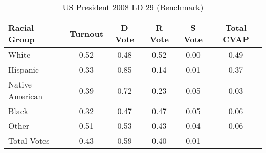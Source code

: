 \begin{table}[htb]
\begin{center}
\caption{US President 2008 LD 29 (Benchmark)}
\label{pres08_cvap_ld_29_benchmark}
\begin{tabular}{lccccc}
  \hline
Racial Group & Turnout & D Vote & R Vote & S Vote & Total CVAP \\ 
  \hline
White & 0.52 & 0.48 & 0.52 & 0.00 & 0.49 \\ 
  Hispanic & 0.33 & 0.85 & 0.14 & 0.01 & 0.37 \\ 
  Native American & 0.39 & 0.72 & 0.23 & 0.05 & 0.03 \\ 
  Black & 0.32 & 0.47 & 0.47 & 0.05 & 0.06 \\ 
  Other & 0.51 & 0.53 & 0.43 & 0.04 & 0.06 \\ 
  Total Votes & 0.43 & 0.59 & 0.40 & 0.01 &  \\ 
   \hline
\end{tabular}
\end{center}
\end{table}
